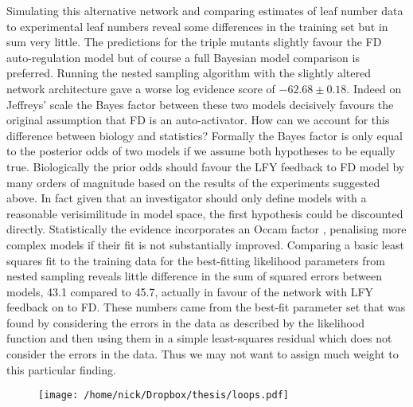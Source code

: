 Simulating this alternative network and comparing estimates of leaf number data to experimental leaf numbers reveal some differences in the training set but in sum very little.
The predictions for the triple mutants slightly favour the FD auto-regulation model but of course a full Bayesian model comparison is preferred.
Running the nested sampling algorithm with the slightly altered network architecture gave a worse log evidence score of $-62.68\pm 0.18$.
Indeed on Jeffreys' scale the Bayes factor between these two models decisively favours the original assumption that FD is an auto-activator.
How can we account for this difference between biology and statistics?
Formally the Bayes factor is only equal to the posterior odds of two models if we assume both hypotheses to be equally true.
Biologically the prior odds should favour the LFY feedback to FD model by many orders of magnitude based on the results of the experiments suggested above.
In fact given that an investigator should only define models with a reasonable verisimilitude in model space, the first hypothesis could be discounted directly.
Statistically the evidence incorporates an Occam factor \cite{mackay2003}, penalising more complex models if their fit is not substantially improved.
Comparing a basic least squares fit to the training data for the best-fitting likelihood parameters from nested sampling reveals little difference in the sum of squared errors between models, 43.1 compared to 45.7, actually in favour of the network with LFY feedback on to FD.
These numbers came from the best-fit parameter set that was found by considering the errors in the data as described by the likelihood function and then using them in a simple least-squares residual which does not consider the errors in the data.
Thus we may not want to assign much weight to this particular finding.

\begin{figure}[!htb]
\centering
\texttt{[image: /home/nick/Dropbox/thesis/loops.pdf]}
\end{figure}

